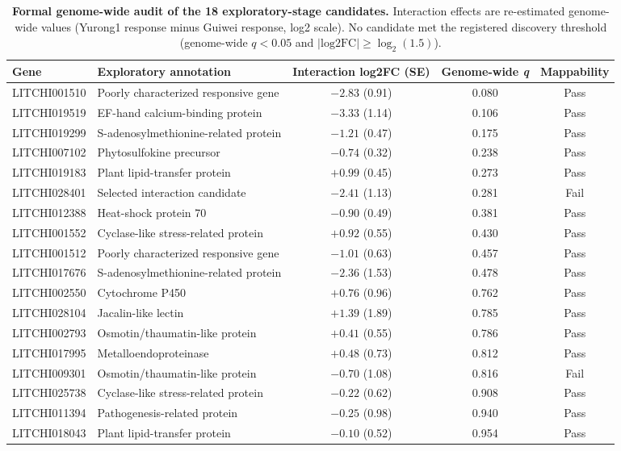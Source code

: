 \documentclass[11pt]{article}
\newcommand{\q}{\textit{q}}
\begin{document}
\begin{table}[p]
\centering
\caption{\textbf{Formal genome-wide audit of the 18 exploratory-stage candidates.} Interaction effects are re-estimated genome-wide values (Yurong1 response minus Guiwei response, log2 scale). No candidate met the registered discovery threshold (genome-wide $\q<0.05$ and $|\mathrm{log2FC}|\ge\log_2(1.5)$).}
\label{tab:legacy}
\footnotesize
\begin{tabular}{@{}llccc@{}}
\toprule
\textbf{Gene} & \textbf{Exploratory annotation} & \textbf{Interaction log2FC (SE)} & \textbf{Genome-wide \q} & \textbf{Mappability} \\
\midrule
LITCHI001510 & Poorly characterized responsive gene & $-2.83$ (0.91) & 0.080 & Pass \\
LITCHI019519 & EF-hand calcium-binding protein & $-3.33$ (1.14) & 0.106 & Pass \\
LITCHI019299 & S-adenosylmethionine-related protein & $-1.21$ (0.47) & 0.175 & Pass \\
LITCHI007102 & Phytosulfokine precursor & $-0.74$ (0.32) & 0.238 & Pass \\
LITCHI019183 & Plant lipid-transfer protein & $+0.99$ (0.45) & 0.273 & Pass \\
LITCHI028401 & Selected interaction candidate & $-2.41$ (1.13) & 0.281 & Fail \\
LITCHI012388 & Heat-shock protein 70 & $-0.90$ (0.49) & 0.381 & Pass \\
LITCHI001552 & Cyclase-like stress-related protein & $+0.92$ (0.55) & 0.430 & Pass \\
LITCHI001512 & Poorly characterized responsive gene & $-1.01$ (0.63) & 0.457 & Pass \\
LITCHI017676 & S-adenosylmethionine-related protein & $-2.36$ (1.53) & 0.478 & Pass \\
LITCHI002550 & Cytochrome P450 & $+0.76$ (0.96) & 0.762 & Pass \\
LITCHI028104 & Jacalin-like lectin & $+1.39$ (1.89) & 0.785 & Pass \\
LITCHI002793 & Osmotin/thaumatin-like protein & $+0.41$ (0.55) & 0.786 & Pass \\
LITCHI017995 & Metalloendoproteinase & $+0.48$ (0.73) & 0.812 & Pass \\
LITCHI009301 & Osmotin/thaumatin-like protein & $-0.70$ (1.08) & 0.816 & Fail \\
LITCHI025738 & Cyclase-like stress-related protein & $-0.22$ (0.62) & 0.908 & Pass \\
LITCHI011394 & Pathogenesis-related protein & $-0.25$ (0.98) & 0.940 & Pass \\
LITCHI018043 & Plant lipid-transfer protein & $-0.10$ (0.52) & 0.954 & Pass \\
\bottomrule
\end{tabular}
\end{table}
\end{document}

